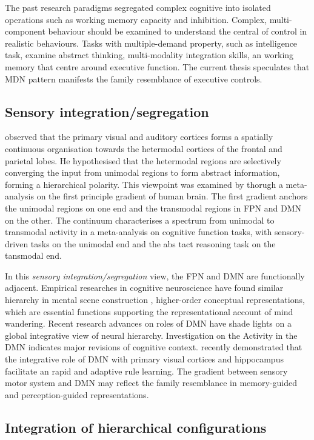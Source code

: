 The past research paradigms segregated complex cognitive into isolated operations such as working memory capacity and inhibition. Complex, multi-component behaviour should be examined to understand the central of control in realistic behaviours. Tasks with multiple-demand property, such as intelligence task, examine abstract thinking, multi-modality integration skills, an working memory that centre around executive function. The current thesis speculates that MDN pattern manifests the family resemblance of executive controls. 

\subsection{Sensory integration/segregation}
 observed that the primary visual and auditory cortices forms a spatially continuous organisation towards the hetermodal cortices of the frontal and parietal lobes. He hypothesised that the hetermodal regions are selectively converging the input from unimodal regions to form abstract information, forming a hierarchical polarity. This viewpoint was examined by  thorugh a meta-analysis on the first principle gradient of human brain. The first gradient anchors the unimodal regions on one end and the transmodal regions in FPN and DMN on the other. The continuum characterises a spectrum from unimodal to transmodal activity in a meta-analysis on cognitive function tasks, with sensory-driven tasks on the unimodal end and the abs tact reasoning task on the tansmodal end. 

In this \textit{sensory integration/segregation} view, the FPN and DMN are functionally adjacent. Empirical researches in cognitive neuroscience have found similar hierarchy in mental scene construction \cite{Villena-Gonzalez2018}, higher-order conceptual representations\cite{Murphy2018}, which are essential functions supporting the representational account of mind wandering. Recent research advances on roles of DMN have shade lights on a global integrative view of neural hierarchy. Investigation on the Activity in the DMN indicates major revisions of cognitive context.  recently demonstrated that the integrative role of DMN with primary visual cortices and hippocampus facilitate an rapid and adaptive rule learning. The gradient between sensory motor system and DMN may reflect the family resemblance in memory-guided and perception-guided representations.


\subsection{Integration of hierarchical configurations}


